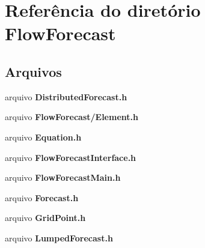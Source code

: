 \section{Referência do diretório Flow\+Forecast}
\label{dir_2183e73e172b28b9f6999048e6defffd}
\subsection*{Arquivos}
\begin{DoxyCompactItemize}
\item 
arquivo {\bf Distributed\+Forecast.\+h}
\item 
arquivo {\bf Flow\+Forecast/\+Element.\+h}
\item 
arquivo {\bf Equation.\+h}
\item 
arquivo {\bf Flow\+Forecast\+Interface.\+h}
\item 
arquivo {\bf Flow\+Forecast\+Main.\+h}
\item 
arquivo {\bf Forecast.\+h}
\item 
arquivo {\bf Grid\+Point.\+h}
\item 
arquivo {\bf Lumped\+Forecast.\+h}
\end{DoxyCompactItemize}
